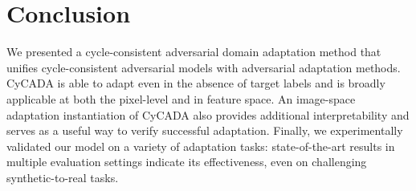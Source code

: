 \section{Conclusion}

We presented a cycle-consistent adversarial domain adaptation method that unifies cycle-consistent adversarial models with adversarial adaptation methods.
CyCADA is able to adapt even in the absence of target labels and is broadly applicable at both the pixel-level and in feature space.
An image-space adaptation instantiation of CyCADA also provides additional interpretability and serves as a useful way to verify successful adaptation.
Finally, we experimentally validated our model on a variety of adaptation tasks: state-of-the-art results in multiple evaluation settings indicate its effectiveness, even on challenging synthetic-to-real tasks. 